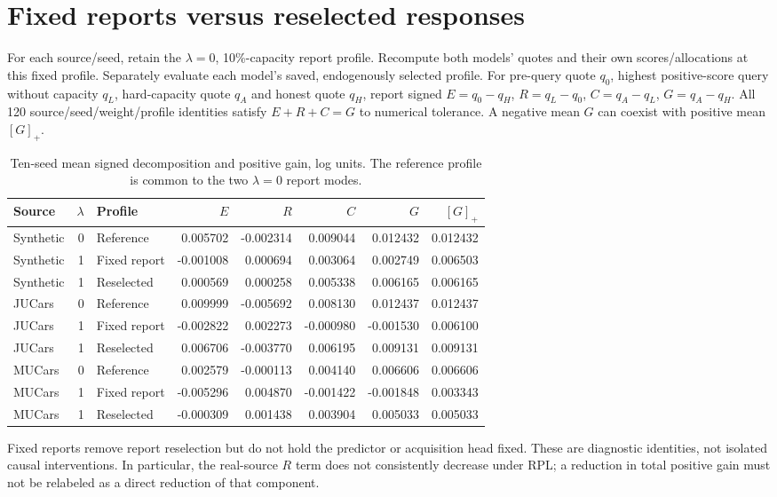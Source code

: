 \documentclass[11pt]{article}
\begin{document}
\section{Fixed reports versus reselected responses}
For each source/seed, retain the $\lambda=0$, 10\%-capacity report profile.
Recompute both models' quotes and their own scores/allocations at this fixed
profile. Separately evaluate each model's saved, endogenously selected profile.
For pre-query quote $q_0$, highest positive-score query without capacity $q_L$,
hard-capacity quote $q_A$ and honest quote $q_H$, report signed
$E=q_0-q_H$, $R=q_L-q_0$, $C=q_A-q_L$, $G=q_A-q_H$.
All 120 source/seed/weight/profile identities satisfy $E+R+C=G$ to numerical
tolerance. A negative mean $G$ can coexist with positive mean $[G]_+$.
\begin{table}[htbp]\centering\small
\caption{Ten-seed mean signed decomposition and positive gain, log units. The reference profile is common to the two $\lambda=0$ report modes.}
\begin{tabular}{lrlrrrrr}\toprule
Source & $\lambda$ & Profile & $E$ & $R$ & $C$ & $G$ & $[G]_+$\\\midrule
Synthetic & 0 & Reference & 0.005702 & -0.002314 & 0.009044 & 0.012432 & 0.012432\\
Synthetic & 1 & Fixed report & -0.001008 & 0.000694 & 0.003064 & 0.002749 & 0.006503\\
Synthetic & 1 & Reselected & 0.000569 & 0.000258 & 0.005338 & 0.006165 & 0.006165\\
JUCars & 0 & Reference & 0.009999 & -0.005692 & 0.008130 & 0.012437 & 0.012437\\
JUCars & 1 & Fixed report & -0.002822 & 0.002273 & -0.000980 & -0.001530 & 0.006100\\
JUCars & 1 & Reselected & 0.006706 & -0.003770 & 0.006195 & 0.009131 & 0.009131\\
MUCars & 0 & Reference & 0.002579 & -0.000113 & 0.004140 & 0.006606 & 0.006606\\
MUCars & 1 & Fixed report & -0.005296 & 0.004870 & -0.001422 & -0.001848 & 0.003343\\
MUCars & 1 & Reselected & -0.000309 & 0.001438 & 0.003904 & 0.005033 & 0.005033\\
\bottomrule\end{tabular}\end{table}
Fixed reports remove report reselection but do not hold the predictor or
acquisition head fixed. These are diagnostic identities, not isolated causal
interventions. In particular, the real-source $R$ term does not consistently
decrease under RPL; a reduction in total positive gain must not be relabeled
as a direct reduction of that component.
\end{document}
